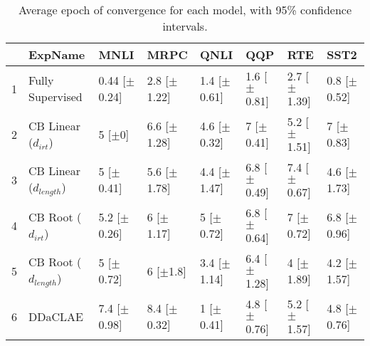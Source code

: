 \begin{table}[ht]
\centering
\begin{tabular}{rlllllll}
  \hline
 & ExpName & MNLI & MRPC & QNLI & QQP & RTE & SST2 \\ 
  \hline
1 & Fully Supervised & 0.44 [$\pm$0.24] & 2.8 [$\pm$1.22] & 1.4 [$\pm$0.61] & 1.6 [$\pm$0.81] & 2.7 [$\pm$1.39] & 0.8 [$\pm$0.52] \\ 
  2 & CB Linear ($d_{irt}$) & 5 [$\pm$0] & 6.6 [$\pm$1.28] & 4.6 [$\pm$0.32] & 7 [$\pm$0.41] & 5.2 [$\pm$1.51] & 7 [$\pm$0.83] \\ 
  3 & CB Linear ($d_{length}$) & 5 [$\pm$0.41] & 5.6 [$\pm$1.78] & 4.4 [$\pm$1.47] & 6.8 [$\pm$0.49] & 7.4 [$\pm$0.67] & 4.6 [$\pm$1.73] \\ 
  4 & CB Root ($d_{irt}$) & 5.2 [$\pm$0.26] & 6 [$\pm$1.17] & 5 [$\pm$0.72] & 6.8 [$\pm$0.64] & 7 [$\pm$0.72] & 6.8 [$\pm$0.96] \\ 
  5 & CB Root ($d_{length}$) & 5 [$\pm$0.72] & 6 [$\pm$1.8] & 3.4 [$\pm$1.14] & 6.4 [$\pm$1.28] & 4 [$\pm$1.89] & 4.2 [$\pm$1.57] \\ 
  6 & DDaCLAE & 7.4 [$\pm$0.98] & 8.4 [$\pm$0.32] & 1 [$\pm$0.41] & 4.8 [$\pm$0.76] & 5.2 [$\pm$1.57] & 4.8 [$\pm$0.76] \\ 
   \hline
\end{tabular}
\caption{Average epoch of convergence for each model, with 95\% confidence intervals.} 
\end{table}
